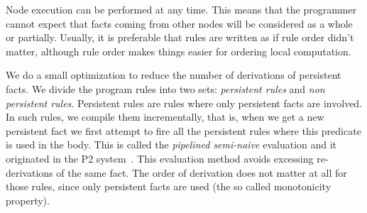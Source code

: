 Node execution can be performed at any time. This means that the programmer cannot expect
that facts coming from other nodes will be considered as a whole or partially.
Usually, it is preferable that rules are written as if rule order didn't matter, although
rule order makes things easier for ordering local computation.

We do a small optimization to reduce the number of derivations of persistent facts. We
divide the program rules into two sets: \emph{persistent rules} and \emph{non persistent rules}.
Persistent rules are rules where only persistent facts are involved. In such rules, we compile
them incrementally, that is, when we get a new persistent fact we first attempt to fire
all the persistent rules where this predicate is used in the body. This is called
the \emph{pipelined semi-naive} evaluation and it originated in the P2 system~\cite{Loo-condie-garofalakis-p2}. This evaluation method avoids excessing re-derivations
of the same fact. The order of derivation does not matter at all for those rules, since
only persistent facts are used (the so called monotonicity property).